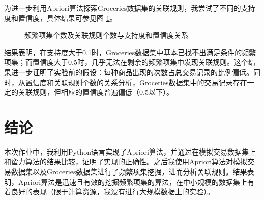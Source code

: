 \documentclass[12pt,a4paper]{article}
\theoremstyle{definition}
\begin{document}
为进一步利用Apriori算法探索Groceries数据集的关联规则，我尝试了不同的支持度和置信度，具体结果可参见图 \ref{fig:apriori}。

\begin{figure}[H]
	\centering
	\caption{频繁项集个数及关联规则个数与支持度和置信度关系}
	\label{fig:apriori}
\end{figure}

结果表明，在支持度大于0.1时，Groceries数据集中基本已找不出满足条件的频繁项集；而置信度大于0.5时，几乎无法在剩余的频繁项集中发现关联规则。这个结果进一步证明了实验前的假设：每种商品出现的次数占总交易记录的比例偏低。同时，从置信度和关联规则个数的关系分析，Groceries数据集中的交易记录存在一定的关联规则，但相应的置信度普遍偏低（0.5以下）。

\section{结论}

本次作业中，我利用Python语言实现了Apriori算法，并通过在模拟交易数据集上和蛮力算法的结果比较，证明了实现的正确性。之后我使用Apriori算法对模拟交易数据集以及Groceries数据集进行了频繁项集挖掘，进而分析关联规则。结果表明，Apriori算法是迅速且有效的挖掘频繁项集的算法，在中小规模的数据集上有着良好的表现（限于计算资源，我没有进行大规模数据上的实验）。
\end{document}

